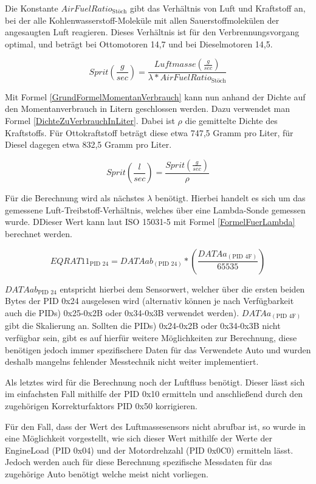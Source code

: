 Die Konstante $AirFuelRatio_\text{Stöch}$ gibt das Verhältnis von Luft und Kraftstoff an, bei der alle
Kohlenwasserstoff-Moleküle mit allen Sauerstoffmolekülen der angesaugten Luft reagieren. Dieses
Verhältnis ist für den Verbrennungsvorgang optimal, und beträgt bei Ottomotoren 14,7 und bei
Dieselmotoren 14,5.

\begin{equation}
\label{GrundFormelMomentanVerbrauch}
Sprit(\frac{g}{sec}) = \frac{Luftmasse(\frac{g}{sec})}{\lambda*AirFuelRatio_\text{Stöch}}
\end{equation}

Mit Formel \ref{GrundFormelMomentanVerbrauch} kann nun anhand der Dichte auf den Momentanverbrauch in Litern geschlossen werden. Dazu verwendet man Formel \ref{DichteZuVerbrauchInLiter}. Dabei ist $\rho$ die gemittelte Dichte des Kraftstoffs. Für Ottokraftstoff beträgt diese etwa 747,5
Gramm pro Liter, für Diesel dagegen etwa 832,5 Gramm pro Liter\cite{Aral2018}. 

\begin{equation}
\label{DichteZuVerbrauchInLiter}
Sprit(\frac{l}{sec}) = \frac{Sprit(\frac{g}{sec})}{\rho}
\end{equation}
 
Für die Berechnung wird als nächstes $\lambda$ benötigt. Hierbei handelt es sich um das gemessene Luft-Treibstoff-Verhältnis, welches über eine Lambda-Sonde gemessen wurde. DDieser Wert kann laut ISO 15031-5 mit Formel \ref{FormelFuerLambda} berechnet werden.

\begin{equation}
\label{FormelFuerLambda}
EQRAT 11_\text{PID 24}=DATAab_{(\text{PID 24})}*(\frac{DATAa_{(\text{PID 4F})}}{65535})
\end{equation}

$DATAab_{\text{PID 24}}$ entspricht hierbei dem Sensorwert, welcher über die ersten beiden Bytes der \ac{PID} 0x24 ausgelesen wird (alternativ können je nach Verfügbarkeit auch die \acp{PID}) 0x25-0x2B oder 0x34-0x3B verwendet werden).
\newline
$DATAa_{(\text{PID 4F})}$ gibt die Skalierung an.
\newline
Sollten die \acp{PID}) 0x24-0x2B oder 0x34-0x3B nicht verfügbar sein, gibt es auf hierfür weitere Möglichkeiten zur Berechnung, diese benötigen jedoch immer spezifischere Daten für das Verwendete Auto und wurden deshalb mangelns fehlender Messtechnik nicht weiter implementiert.

Als letztes wird für die Berechnung noch der Luftfluss benötigt. Dieser lässt sich im einfachsten Fall mithilfe der \ac{PID} 0x10 ermitteln und anschließend durch den zugehörigen Korrekturfaktors \ac{PID} 0x50 korrigieren.

Für den Fall, dass der Wert des Luftmassesensors nicht abrufbar ist, so wurde in  eine Möglichkeit vorgestellt, wie sich dieser Wert mithilfe der Werte der EngineLoad (\ac{PID} 0x04) und der Motordrehzahl (\ac{PID} 0x0C0) ermitteln lässt. Jedoch werden auch für diese Berechnung spezifische Messdaten für das zugehörige Auto benötigt welche meist nicht vorliegen.

 
 
 
 
